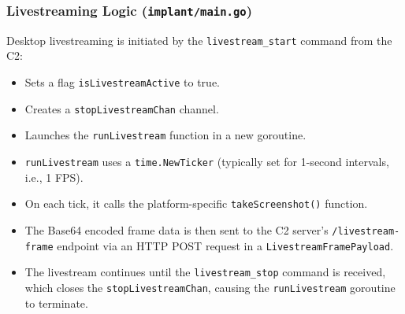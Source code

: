 \subsubsection{Livestreaming Logic (\texttt{implant/main.go})}
Desktop livestreaming is initiated by the \texttt{livestream\_start} command from the C2:
\begin{itemize}
    \item Sets a flag \texttt{isLivestreamActive} to true.
    \item Creates a \texttt{stopLivestreamChan} channel.
    \item Launches the \texttt{runLivestream} function in a new goroutine.
    \item \texttt{runLivestream} uses a \texttt{time.NewTicker} (typically set for 1-second intervals, i.e., 1 FPS).
    \item On each tick, it calls the platform-specific \texttt{takeScreenshot()} function.
    \item The Base64 encoded frame data is then sent to the C2 server's \texttt{/livestream-frame} endpoint via an HTTP POST request in a \texttt{LivestreamFramePayload}.
    \item The livestream continues until the \texttt{livestream\_stop} command is received, which closes the \texttt{stopLivestreamChan}, causing the \texttt{runLivestream} goroutine to terminate.
\end{itemize}

